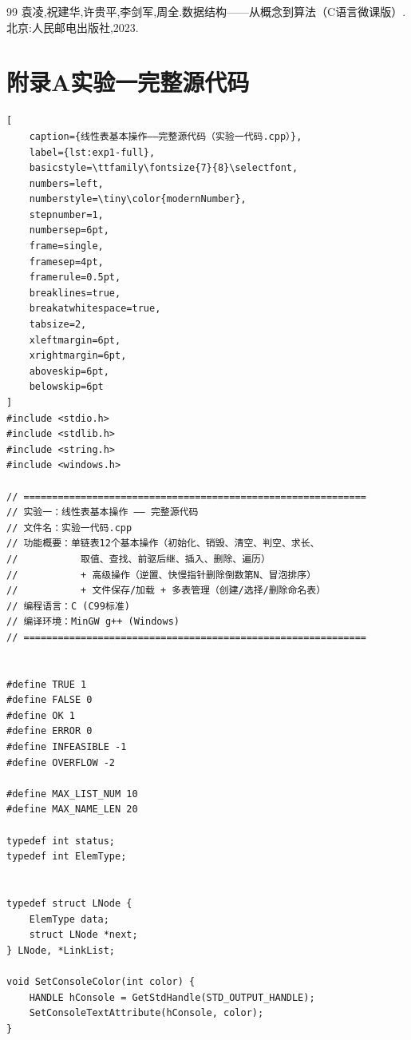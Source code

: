\documentclass[supercite]{Experimental_Report}
\begin{document}
{\newpage

\begin{thebibliography}{99}
 袁凌,祝建华,许贵平,李剑军,周全.数据结构——从概念到算法（C语言微课版）.北京:人民邮电出版社,2023.
\end{thebibliography}

\newpage

\section*{附录A\quad 实验一完整源代码}


\begin{lstlisting}[
    caption={线性表基本操作——完整源代码（实验一代码.cpp）},
    label={lst:exp1-full},
    basicstyle=\ttfamily\fontsize{7}{8}\selectfont,
    numbers=left,
    numberstyle=\tiny\color{modernNumber},
    stepnumber=1,
    numbersep=6pt,
    frame=single,
    framesep=4pt,
    framerule=0.5pt,
    breaklines=true,
    breakatwhitespace=true,
    tabsize=2,
    xleftmargin=6pt,
    xrightmargin=6pt,
    aboveskip=6pt,
    belowskip=6pt
]
#include <stdio.h>
#include <stdlib.h>
#include <string.h>
#include <windows.h>

// ============================================================
// 实验一：线性表基本操作 —— 完整源代码
// 文件名：实验一代码.cpp
// 功能概要：单链表12个基本操作（初始化、销毁、清空、判空、求长、
//           取值、查找、前驱后继、插入、删除、遍历）
//           + 高级操作（逆置、快慢指针删除倒数第N、冒泡排序）
//           + 文件保存/加载 + 多表管理（创建/选择/删除命名表）
// 编程语言：C (C99标准)
// 编译环境：MinGW g++ (Windows)
// ============================================================


#define TRUE 1
#define FALSE 0
#define OK 1
#define ERROR 0
#define INFEASIBLE -1
#define OVERFLOW -2

#define MAX_LIST_NUM 10
#define MAX_NAME_LEN 20

typedef int status;
typedef int ElemType;


typedef struct LNode {
    ElemType data;
    struct LNode *next;
} LNode, *LinkList;

void SetConsoleColor(int color) {
    HANDLE hConsole = GetStdHandle(STD_OUTPUT_HANDLE);
    SetConsoleTextAttribute(hConsole, color);
}


\end{lstlisting}}
\end{document}
